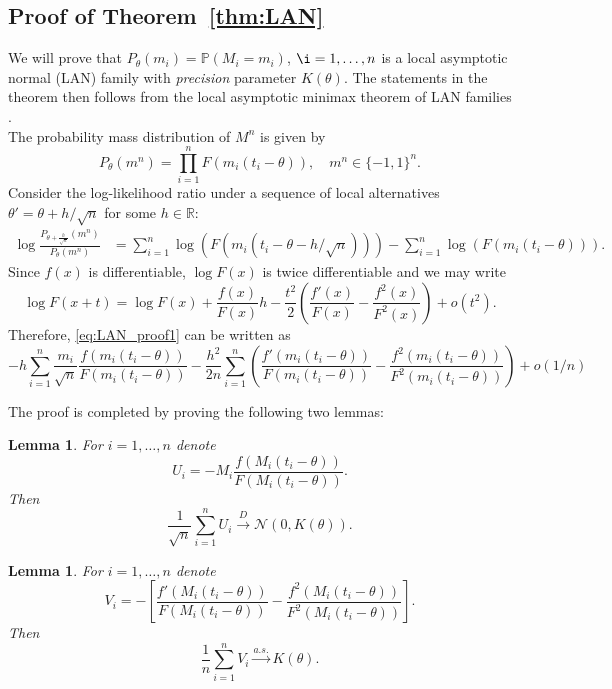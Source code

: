 \documentclass[letterpaper, conference, 11pt]{IEEEtran}      %
\newtheorem{lem}[thm]{\bf {Lemma}}
\begin{document}
\subsection*{Proof of Theorem~\ref{thm:LAN}}
We will prove that $P_\theta(m_i) = \mathbb P(M_i = m_i)$, $\i=1,\ldots,n$ is a local asymptotic normal (LAN) family  with \emph{precision} parameter $K(\theta)$. The statements in the theorem then follows from the local asymptotic minimax theorem of LAN families \cite{van2000asymptotic}. \\

The probability mass distribution of $M^n$ is given by
\[
P_\theta(m^n) =  \prod_{i=1}^n F \left( m_i (t_i - \theta)\right), \quad m^n \in \{-1,1\}^n.
\]
Consider the log-likelihood ratio under a sequence of local alternatives $\theta' = \theta + h/\sqrt{n}$ for some $h\in \mathbb R$:
\begin{align}
\log \frac{ P_{\theta + \frac{h}{\sqrt{n}}}(m^n)} { P_\theta (m^n) }& =  \sum_{i=1}^n \log \left( F \left( m_i (t_i - \theta - h/\sqrt{n} ) \right)\right)  - \sum_{i=1}^n \log \left( F \left( m_i (t_i - \theta) \right) \right). \label{eq:LAN_proof1}
\end{align}
Since $f(x)$ is differentiable, $\log F(x)$ is twice differentiable and we may write
\[
\log F(x+t) = \log F(x) + \frac{f(x)}{F(x)}h - \frac{t^2}{2}\left( \frac{f'(x)}{F(x)} - \frac{f^2(x)}{F^2(x)} \right) + o(t^2).
\]
Therefore, \eqref{eq:LAN_proof1} can be written as
\[
- h \sum_{i=1}^n  \frac{m_i}{\sqrt{n} }  \frac{ f \left(m_i (t_i-\theta) \right)} {F \left( m_i (t_i-\theta) \right) }  - \frac{h^2}{2 n} \sum_{i=1}^n  \left( \frac{f' \left(m_i (t_i-\theta) \right) }{F\left(m_i (t_i-\theta)\right) }- \frac{ f^2\left(m_i (t_i-\theta) \right)}{F^2\left(m_i (t_i-\theta) \right)}   \right) + o(1/n)
\] 

The proof is completed by proving the following two lemmas:
\begin{lem} \label{lem:LAN1}
For $i=1,\ldots,n$ denote 
\[
U_i = -M_i \frac{ f \left( M_i (t_i - \theta) \right)}{ F \left( M_i (t_i - \theta)\right) }. 
\]
Then 
\[
\frac{1}{\sqrt{n}} \sum_{i=1}^n U_i \overset{D}{\rightarrow} \mathcal N\left(0, K(\theta) \right). 
\]
\end{lem}
\begin{lem} \label{lem:LAN2}
For $i=1,\ldots,n$ denote
\[
V_i =  -\left[ \frac{f' \left(M_i (t_i-\theta) \right) }{F\left(M_i (t_i-\theta)\right) }- \frac{ f^2\left(M_i (t_i-\theta) \right)}{F^2\left(M_i (t_i-\theta) \right)} \right] .
\]
Then 
\[
\frac{1}{n} \sum_{i=1}^n V_i \overset{a.s.}{\rightarrow} K(\theta). 
\]
\end{lem}
\end{document}
